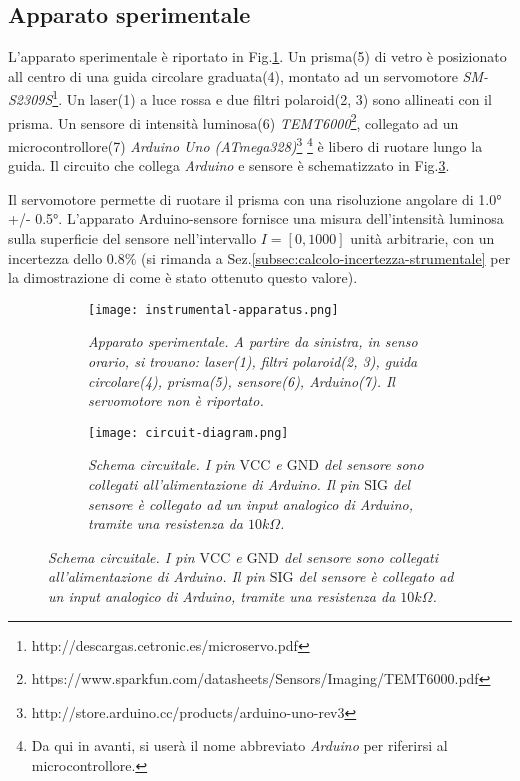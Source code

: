 \subsection{Apparato sperimentale}\label{subsec:apparato-sperimentale}
  L’apparato sperimentale è riportato in Fig.\ref{fig:apparato-strumentale}.
  Un prisma(5) di vetro è posizionato all centro di una guida circolare graduata(4),
  montato ad un servomotore \emph{SM-S2309S}\footnote{http://descargas.cetronic.es/microservo.pdf}.
  Un laser(1) a luce rossa e due filtri polaroid(2, 3) sono
  allineati con il prisma. Un sensore di intensità luminosa(6) \emph{TEMT6000}\footnote{https://www.sparkfun.com/datasheets/Sensors/Imaging/TEMT6000.pdf},
  collegato ad un microcontrollore(7) \emph{Arduino Uno (ATmega328)}\footnote{http://store.arduino.cc/products/arduino-uno-rev3}
  \footnote{Da qui in avanti, si userà il nome abbreviato \emph{Arduino} per riferirsi al microcontrollore.}
  è libero di ruotare lungo la guida.
  Il circuito che collega \emph{Arduino} e sensore è schematizzato in Fig.\ref{fig:diagramma-circuito}.

  Il servomotore permette di ruotare il prisma con una risoluzione angolare di 1.0° +/- 0.5°.
  L'apparato Arduino-sensore fornisce una misura dell'intensità luminosa
  sulla superficie del sensore nell'intervallo $I = [0, 1000]$ unità arbitrarie,
  con un incertezza dello $0.8\%$ (si rimanda a Sez.\ref{subsec:calcolo-incertezza-strumentale}
  per la dimostrazione di come è stato ottenuto questo valore).
%
  \begin{figure}[h]
    \centering
    \caption{Apparato sperimentale e schema circuitale.}
    \begin{subfigure}{.4\textwidth}
      \texttt{[image: instrumental-apparatus.png]}
      \caption{
        \emph{
          Apparato sperimentale. A partire da sinistra, in senso orario,
          si trovano: laser(1), filtri polaroid(2, 3), guida circolare(4),
          prisma(5), sensore(6), Arduino(7). Il servomotore non è riportato.
        }
      }
      \label{fig:apparato-strumentale}
    \end{subfigure}%
    \hspace{20mm}
    \begin{subfigure}{.4\textwidth}
      \texttt{[image: circuit-diagram.png]}
      \caption{
        \emph{
          Schema circuitale. I pin $\text{VCC}$ e $\text{GND}$ del sensore sono collegati
          all'alimentazione di Arduino. Il pin $\text{SIG}$
          del sensore è collegato ad un input analogico di Arduino, tramite una
          resistenza da $10k\Omega$.
        }
      }
      \label{fig:diagramma-circuito}
    \end{subfigure}
  \end{figure}
%
